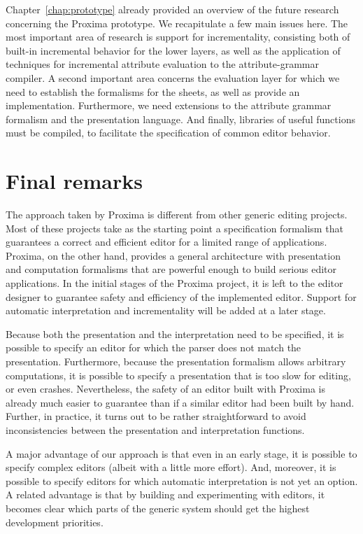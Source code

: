 Chapter~\ref{chap:prototype} already provided an overview of the future research concerning the Proxima prototype. We recapitulate a few main issues here. The most important area of research is support for incrementality, consisting both of built-in incremental behavior for the lower layers, as well as the application of techniques for incremental attribute evaluation to the attribute-grammar compiler. A second important area concerns the evaluation layer for which we need to establish the formalisms for the sheets, as well as provide an implementation. Furthermore, we need extensions to the attribute grammar formalism and the {\Xprez} presentation language.  And finally, libraries of useful functions must be compiled, to facilitate the specification of common editor behavior.



\section{Final remarks}

% 
The approach taken by Proxima is different from other generic editing projects. Most of these projects take as the starting point a specification formalism that guarantees a correct and efficient editor for a limited range of applications. Proxima, on the other hand, provides a general architecture with presentation and computation formalisms that are powerful enough to build serious editor applications. In the initial stages of the Proxima project, it is left to the editor designer to  guarantee safety and efficiency of the implemented editor. Support for automatic interpretation and incrementality  will be added at a later stage.

Because both the presentation and the interpretation need to be specified, it is possible to specify an editor for which the parser does not match the presentation. Furthermore, because the presentation formalism allows arbitrary computations, it is possible to specify a presentation that is too slow for editing, or even crashes.  Nevertheless, the safety of an editor built with Proxima is already much easier to guarantee than if a similar editor had been built by hand. Further, in practice, it turns out to be rather straightforward to avoid inconsistencies between the presentation and interpretation functions.

A major advantage of our approach is that even in an early stage, it is possible to specify complex editors (albeit with a little more effort). And, moreover, it is possible to specify editors for which automatic interpretation is not yet an option. A related advantage is that by building and experimenting with editors, it becomes clear which parts of the generic system should get the highest development priorities.

